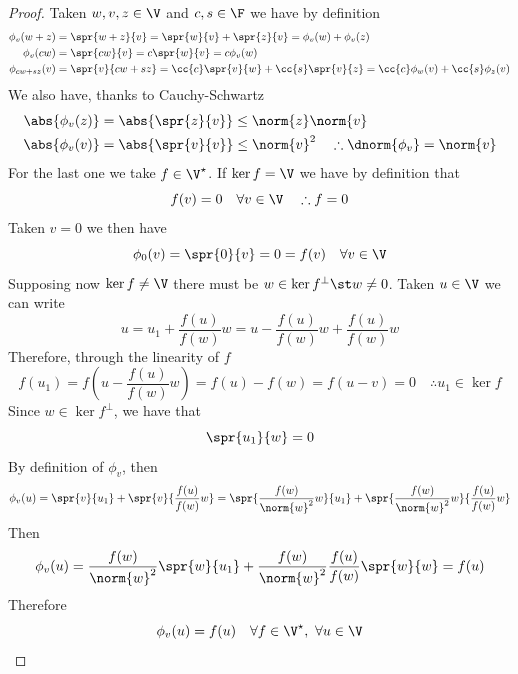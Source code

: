 \documentclass[../mmf.tex]{subfiles}
\begin{document}
\begin{proof}
	Taken $w,v,z\in\V$ and $c,s\in\F$ we have by definition
	\begin{equation*}
		\begin{aligned}
			\phi_v(w+z)&=\spr{w+z}{v}=\spr{w}{v}+\spr{z}{v}=\phi_v(w)+\phi_v(z)\\
			\phi_v(cw)&=\spr{cw}{v}=c\spr{w}{v}=c\phi_v(w)\\
			\phi_{cw+sz}(v)&=\spr{v}{cw+sz}=\cc{c}\spr{v}{w}+\cc{s}\spr{v}{z}=\cc{c}\phi_w(v)+\cc{s}\phi_z(v)
		\end{aligned}
	\end{equation*}
	We also have, thanks to Cauchy-Schwartz
	\begin{equation*}
		\begin{aligned}
			\abs{\phi_v(z)}&=\abs{\spr{z}{v}}\le\norm{z}\norm{v}\\
			\abs{\phi_v(v)}&=\abs{\spr{v}{v}}\le\norm{v}^2\quad\therefore\dnorm{\phi_v}=\norm{v}
		\end{aligned}
	\end{equation*}
	For the last one we take $f\in\V^\star$. If $\ker f=\V$ we have by definition that
	\begin{equation*}
		f(v)=0\quad\forall v\in\V\quad\therefore f=0
	\end{equation*}
	Taken $v=0$ we then have
	\begin{equation*}
		\phi_0(v)=\spr{0}{v}=0=f(v)\quad\forall v\in\V
	\end{equation*}
	Supposing now $\ker f\ne\V$ there must be $w\in\ker f^\perp\st w\ne0$. Taken $u\in\V$ we can write
	\begin{equation*}
		u=u_1+\frac{f(u)}{f(w)}w=u-\frac{f(u)}{f(w)}w+\frac{f(u)}{f(w)}w
	\end{equation*}
	Therefore, through the linearity of $f$
	\begin{equation*}
		f(u_1)=f\left( u-\frac{f(u)}{f(w)}w \right)=f(u)-f(w)=f(u-v)=0\quad\therefore u_1\in\ker f
	\end{equation*}
	Since $w\in\ker f^\perp$, we have that
	\begin{equation*}
		\spr{u_1}{w}=0
	\end{equation*}
	By definition of $\phi_v$, then
	\begin{equation*}
		\phi_v(u)=\spr{v}{u_1}+\spr{v}{\frac{f(u)}{f(w)}w}=\spr{\frac{f(w)}{\norm{w}^2}w}{u_1}+\spr{\frac{f(w)}{\norm{w}^2}w}{\frac{f(u)}{f(w)}w}
	\end{equation*}
	Then
	\begin{equation*}
		\phi_v(u)=\frac{f(w)}{\norm{w}^2}\spr{w}{u_1}+\frac{f(w)}{\norm{w}^2}\frac{f(u)}{f(w)}\spr{w}{w}=f(u)
	\end{equation*}
	Therefore
	\begin{equation*}
		\phi_v(u)=f(u)\quad\forall f\in\V^\star,\ \forall u\in\V
	\end{equation*}
\end{proof}
\end{document}
